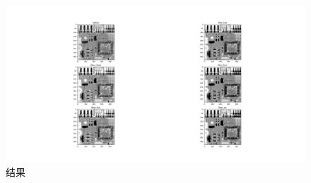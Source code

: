 \documentclass[fontset=windows]{article}
\begin{document}
            \begin{figure}[H]
                \centering
                \includegraphics[scale=0.2]{contrast.png}
                \caption{结果}
            \end{figure}
\end{document}
